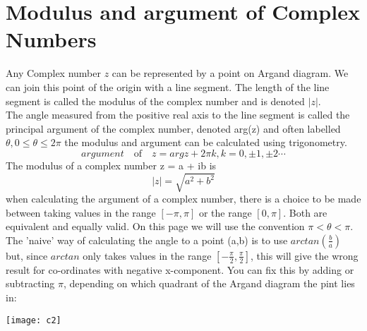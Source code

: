 \documentclass[a4paper, 12pt]{report}
\begin{document}
{\section{Modulus and argument of Complex Numbers}
Any Complex number $z$ can be represented by a point on Argand diagram. We can join this point of the origin with a line segment. The length of the line segment is called the modulus of the complex number and is denoted $|z|$.\\
The angle measured from the positive real axis to the line segment is called the principal argument of the complex number, denoted arg(z) and often labelled $\theta, 0 \leq \theta \leq 2\pi$ the modulus and argument can be calculated using trigonometry.
\begin{equation*}
argument\quad \text{of}\quad z = argz + 2\pi k, k = 0, \pm 1, \pm 2\cdots
\end{equation*}
The modulus of a complex number z = a + ib is
\begin{equation*}
|z| = \sqrt{a^2 + b^2}
\end{equation*}
when calculating the argument of a complex number, there is a choice to be made between taking values in the range $[-\pi, \pi]$ or the range $[0, \pi]$. Both are equivalent and equally valid. On this page we will use the convention $\pi < \theta < \pi$.\\
The 'naive' way of calculating the angle to a point (a,b) is to use $arctan(\frac{b}{a})$ but, since $arctan$ only takes values in the range $[-\frac{\pi}{2},\frac{\pi}{2}]$, this will give the wrong result for co-ordinates with negative x-component. You can fix this by adding or subtracting $\pi$, depending on which quadrant of the Argand diagram the pint lies in:
\begin{center}
\texttt{[image: c2]}
\end{center}

}
\end{document}
